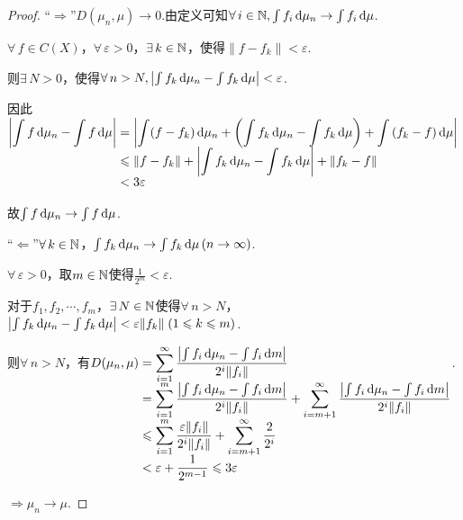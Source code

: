 \begin{proof}
    “$\Rightarrow$”$D(\mu_n,\mu)\to 0$.由定义可知$\forall\, i\in\mathbb{N},\int f_i\mathop{}\!\mathrm{d}\mu_n\to\int f_i\mathop{}\!\mathrm{d}\mu$.\par
    $\forall\,f\in C(X)$，$\forall\,\varepsilon>0$，$\exists\,k\in\mathbb{N}$，使得$\|f-f_k\|<\varepsilon$.\par
    则$\exists\, N>0$，使得$\forall\, n>N,\left|\int f_k\mathop{}\!\mathrm{d}\mu_n-\int f_k\mathop{}\!\mathrm{d}\mu\right|<\varepsilon$.\par
    因此$\setjot[-2]\begin{aligned}[t]
        \left|\int f\d\mu_n-\int f\d\mu\right|&=\left|\int(f-f_k)\d\mu_n+\left(\int{f_k}\d\mu_n-\int{f_k}\d\mu\right)+\int\left(f_k-f\right)\d\mu\right| \\
        &\leq \|f-f_k\|+\left|\int{f_k}\d\mu_n-\int{f_k}\d\mu\right|+\|f_k-f\| \\
        &<3\varepsilon
    \end{aligned}$\par
    故$\int{f}\mathop{}\!\mathrm{d}\mu_n\to\int{f}\mathop{}\!\mathrm{d}\mu$.\par
    “$\Leftarrow$”$\forall\, k\in\mathbb{N}$，$\int{f_k}\mathop{}\!\mathrm{d}\mu_n\to\int{f_k}\mathop{}\!\mathrm{d}\mu\,(n\to\infty)$.\par
    $\forall\,\varepsilon>0$，取$m\in\mathbb{N}$使得$\frac{1}{2^m}<\varepsilon$.\par
    对于$f_1,f_2,\cdots,f_m$，$\exists\,N\in\mathbb{N}$使得$\forall\,n>N$，$\left|\int{f_k}\mathop{}\!\mathrm{d}\mu_n-\int{f_k}\mathop{}\!\mathrm{d}\mu\right|<\varepsilon\|f_k\|\;(1\leqslant k\leqslant m)$.\par
    则$\forall\, n>N$，有$\setjot[-2]\begin{aligned}[t]
        D(\mu_n,\mu)&=\sum_{i=1}^\infty\frac{\left|\int f_i\d\mu_n-\int f_i\d m\right|}{2^i\|f_i\|}\\
        &=\sum_{i=1}^m\frac{\left|\int f_i\d\mu_n-\int f_i\d m\right|}{2^i\|f_i\|}+\sum_{i=m+1}^\infty\frac{\left|\int f_i\d\mu_n-\int f_i\d m\right|}{2^i\|f_i\|} \\
        &\leq\sum_{i=1}^m\frac{\varepsilon\|f_i\|}{2^i\|f_i\|}+\sum_{i=m+1}^\infty\frac{2}{2^i} \\
        &<\varepsilon+\frac{1}{2^{m-1}}\leq 3\varepsilon
    \end{aligned}$.\par
    $\Rightarrow \mu_n\to\mu$.
\end{proof}

